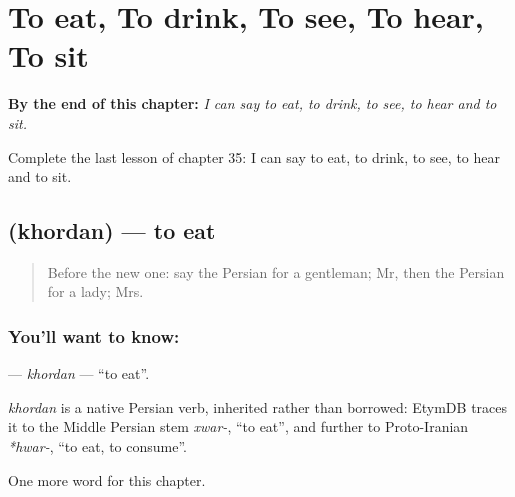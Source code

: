 
\chapter{To eat, To drink, To see, To hear, To sit}
\label{ch:fa-to-eat-to-drink-to-see-to-hear-to-sit}

\begin{chapteropening}
\textbf{By the end of this chapter:} \emph{I can say to eat, to drink, to see, to hear and to sit.}

Complete the last lesson of chapter 35: I can say to eat, to drink, to see, to hear and to sit.
\end{chapteropening}

\section[\texorpdfstring{\fa{خوردن} (khordan)}{خوردن (khordan)}]{ (khordan) — to eat}

\label{lesson:FA-C35-khordan}



\begin{quote}
Before the new one: say the Persian for a gentleman; Mr, then the Persian for a lady; Mrs.
\end{quote}

\subsection*{You'll want to know: }
\textbf{} — \emph{khordan} — \textquotedblleft{}to eat\textquotedblright{}.

\begin{cousinweb}
\emph{khordan} is a native Persian verb, inherited rather than borrowed: EtymDB traces it to the Middle Persian stem \emph{xwar-}, \textquotedblleft{}to eat\textquotedblright{}, and further to Proto-Iranian \emph{*hwar-}, \textquotedblleft{}to eat, to consume\textquotedblright{}.
\end{cousinweb}

\begin{grammarlens}[title={What you've built}]
One more word for this chapter.
\end{grammarlens}

